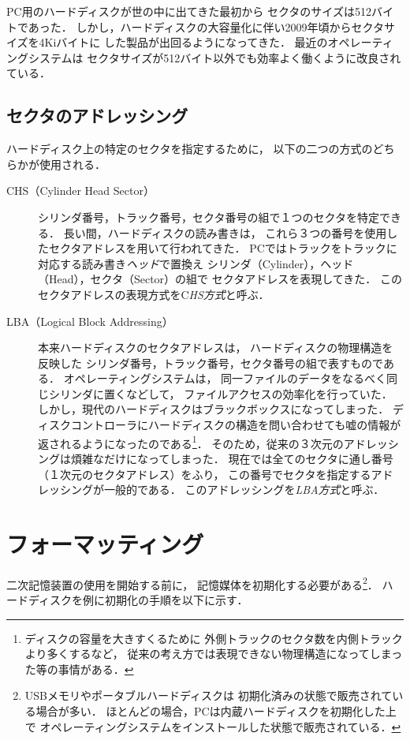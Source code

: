 PC用のハードディスクが世の中に出てきた最初から
セクタのサイズは512バイトであった．
しかし，ハードディスクの大容量化に伴い2009年頃からセクタサイズを4Kiバイトに
した製品が出回るようになってきた．
最近のオペレーティングシステムは
セクタサイズが512バイト以外でも効率よく働くように改良されている．

\subsection{セクタのアドレッシング}
ハードディスク上の特定のセクタを指定するために，
以下の二つの方式のどちらかが使用される．

\begin{description}
\item[CHS（Cylinder Head Sector）]
  シリンダ番号，トラック番号，セクタ番号の組で１つのセクタを特定できる．
  長い間，ハードディスクの読み書きは，
  これら３つの番号を使用したセクタアドレスを用いて行われてきた．
  PCではトラックをトラックに対応する読み書き\emph{ヘッド}で置換え
  シリンダ（Cylinder），ヘッド（Head），セクタ（Sector）の組で
  セクタアドレスを表現してきた．
  このセクタアドレスの表現方式をC\emph{HS方式}と呼ぶ．
\item[LBA（Logical Block Addressing）]
  本来ハードディスクのセクタアドレスは，
  ハードディスクの物理構造を反映した
  シリンダ番号，トラック番号，セクタ番号の組で表すものである．
  オペレーティングシステムは，
  同一ファイルのデータをなるべく同じシリンダに置くなどして，
  ファイルアクセスの効率化を行っていた．
  しかし，現代のハードディスクはブラックボックスになってしまった．
  ディスクコントローラにハードディスクの構造を問い合わせても嘘の情報が
  返されるようになったのである\footnote{
    ディスクの容量を大きすくるために
    外側トラックのセクタ数を内側トラックより多くするなど，
    従来の考え方では表現できない物理構造になってしまった等の事情がある．}．
  そのため，従来の３次元のアドレッシングは煩雑なだけになってしまった．
  現在では全てのセクタに通し番号（１次元のセクタアドレス）をふり，
  この番号でセクタを指定するアドレッシングが一般的である．
  このアドレッシングを\emph{LBA方式}と呼ぶ．
\end{description}

\section{フォーマッティング}
二次記憶装置の使用を開始する前に，
記憶媒体を初期化する必要がある\footnote{
  USBメモリやポータブルハードディスクは
  初期化済みの状態で販売されている場合が多い．
  ほとんどの場合，PCは内蔵ハードディスクを初期化した上で
  オペレーティングシステムをインストールした状態で販売されている．
}．
ハードディスクを例に初期化の手順を以下に示す．

